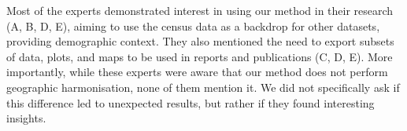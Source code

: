 Most of the experts demonstrated interest in using our method in their research
(A, B, D, E), aiming to use the census data as a backdrop for other datasets,
providing demographic context. They also mentioned the need to export subsets of
data, plots, and maps to be used in reports and publications (C, D, E). More
importantly, while these experts were aware that our method does not perform
geographic harmonisation, none of them mention it. We did not specifically ask
if this difference led to unexpected results, but rather if they found
interesting insights. 